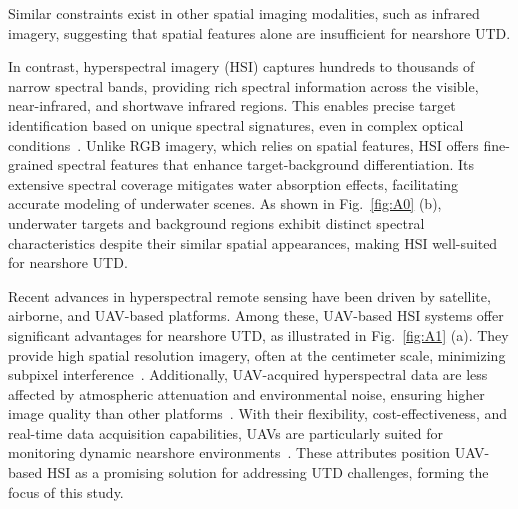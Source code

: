 Similar constraints exist in other spatial imaging modalities, such as infrared imagery, suggesting that spatial features alone are insufficient for nearshore UTD.  
\par  
In contrast, hyperspectral imagery (HSI) captures hundreds to thousands of narrow spectral bands, providing rich spectral information across the visible, near-infrared, and shortwave infrared regions.  
This enables precise target identification based on unique spectral signatures, even in complex optical conditions~\cite{Manolakis2014}.  
Unlike RGB imagery, which relies on spatial features, HSI offers fine-grained spectral features that enhance target-background differentiation.  
Its extensive spectral coverage mitigates water absorption effects, facilitating accurate modeling of underwater scenes.  
As shown in Fig.~\ref{fig:A0} (b), underwater targets and background regions exhibit distinct spectral characteristics despite their similar spatial appearances, making HSI well-suited for nearshore UTD.  
\par  
Recent advances in hyperspectral remote sensing have been driven by satellite, airborne, and UAV-based platforms.  
Among these, UAV-based HSI systems offer significant advantages for nearshore UTD, as illustrated in Fig.~\ref{fig:A1} (a).  
They provide high spatial resolution imagery, often at the centimeter scale, minimizing subpixel interference~\cite{Jiao2022}.  
Additionally, UAV-acquired hyperspectral data are less affected by atmospheric attenuation and environmental noise, ensuring higher image quality than other platforms~\cite{Phang2023, Gu2023}.  
With their flexibility, cost-effectiveness, and real-time data acquisition capabilities, UAVs are particularly suited for monitoring dynamic nearshore environments~\cite{Zhong2020}.  
These attributes position UAV-based HSI as a promising solution for addressing UTD challenges, forming the focus of this study.  
